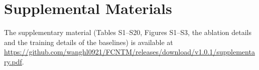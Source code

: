 \documentclass[Journal,letterpaper,NoLists]{ascelike-new}
\begin{document}
\section{Supplemental Materials}

The supplementary material (Tables S1--S20, Figures S1--S3, the ablation details and the training
details of the baselines) is available at
\url{https://github.com/wanghl0921/FCNTM/releases/download/v1.0.1/supplementary.pdf}.


\end{document}

